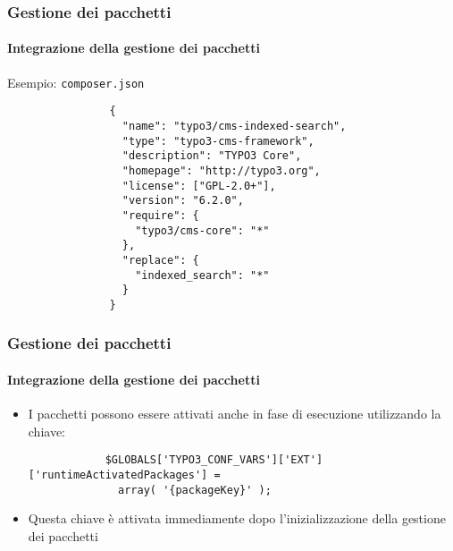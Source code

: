 
\begin{frame}[fragile]
	\frametitle{Gestione dei pacchetti}
	\framesubtitle{Integrazione della gestione dei pacchetti}

	Esempio: \texttt{composer.json}

	\lstset{
		basicstyle=\tiny\ttfamily
	}

        \begin{lstlisting}
                {
                  "name": "typo3/cms-indexed-search",
                  "type": "typo3-cms-framework",
                  "description": "TYPO3 Core",
                  "homepage": "http://typo3.org",
                  "license": ["GPL-2.0+"],
                  "version": "6.2.0",
                  "require": {
                    "typo3/cms-core": "*"
                  },
                  "replace": {
                    "indexed_search": "*"
                  }
                }
        \end{lstlisting}

\end{frame}


\begin{frame}[fragile]
	\frametitle{Gestione dei pacchetti}
	\framesubtitle{Integrazione della gestione dei pacchetti}

	\lstset{
		basicstyle=\smaller\ttfamily
	}

	\begin{itemize}
		\item I pacchetti possono essere attivati anche in fase di esecuzione utilizzando la chiave:
		\begin{lstlisting}
			$GLOBALS['TYPO3_CONF_VARS']['EXT']['runtimeActivatedPackages'] =
			  array( '{packageKey}' );
		\end{lstlisting}

		\item Questa chiave è attivata immediamente dopo l'inizializzazione della gestione dei pacchetti

	\end{itemize}

\end{frame}


